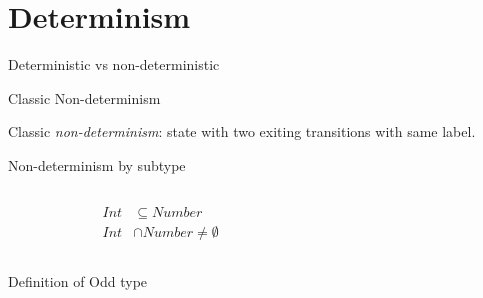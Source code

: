 \section{Determinism}

\begin{frame}{Deterministic vs non-deterministic }
  
\end{frame}

\begin{frame}{Classic Non-determinism}
  \scalebox{0.8}{}

  Classic \emph{non-determinism}: state with two exiting transitions with same label.

\end{frame}

\begin{frame}{Non-determinism by subtype}
  \begin{columns}[T]
    \begin{column}{0.4\textwidth}
      \centering
      
      \begin{align*}
        Int&\subseteq Number\\
        Int &\cap Number \neq \emptyset
      \end{align*}%
      \scalebox{0.8}{}
    \end{column}%
    \begin{column}{0.6\textwidth}
      \only<1>{\scalebox{0.65}{}}%
    \end{column}
  \end{columns}
\end{frame}



\newsavebox\oddbox
\begin{lrbox}{\oddbox}
  \begin{minipage}{11cm}
    
  \end{minipage}
\end{lrbox}

\begin{frame}{Definition of Odd type}
  \usebox\oddbox
\end{frame}


